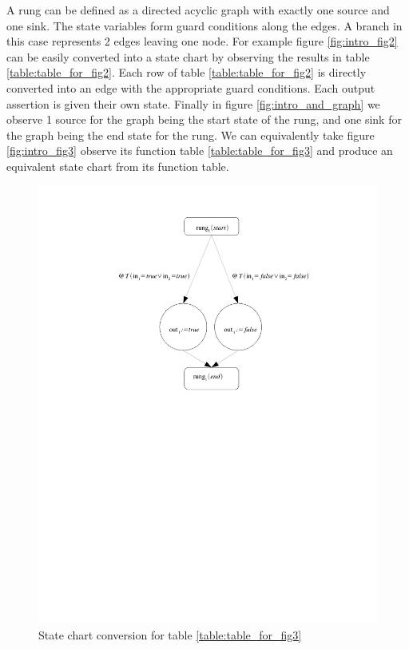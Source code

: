 A rung can be defined as a directed acyclic graph with exactly one source and one sink. The state variables form guard conditions along the edges. A branch in this case represents 2 edges leaving one node. For example figure \ref{fig:intro_fig2}
can be easily converted into a state chart by observing the results in table \ref{table:table_for_fig2}. 
Each row of table \ref{table:table_for_fig2} is directly converted into an edge with the appropriate guard conditions.
Each output assertion is given their own state. Finally in figure \ref{fig:intro_and_graph} we observe 1 source for the
graph being the start state of the rung, and one sink for the graph being the end state for the rung. We can equivalently take figure \ref{fig:intro_fig3} observe its function table \ref{table:table_for_fig3} and produce an equivalent state chart from its function table.

\pagebreak[3]

\begin{figure}[htp]
    \centering
    \includegraphics[trim= 50mm 140mm 50mm 10mm, clip, width=\imgmedsmall]{./images/intro_or_graph.pdf} %
    \caption{State chart conversion for table \ref{table:table_for_fig3}}
    \label{fig:intro_or_graph}
\end{figure}

